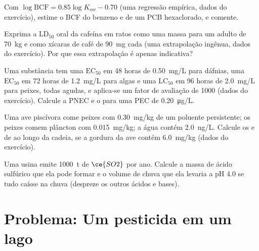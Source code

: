 \begin{exercise}[$\star\star$]\label{exo:b3:environmental-toxicology:8}
Com $\log\mathrm{BCF} = 0.85\log K_{ow} - 0.70$ (uma regressão empírica, dados do exercício), estime o BCF do
benzeno e de um PCB hexaclorado, e comente.
\end{exercise}

\begin{exercise}[$\star\star$]\label{exo:b3:environmental-toxicology:9}
Exprima a $\mathrm{LD_{50}}$ oral da cafeína em ratos como uma massa para um adulto de \qty{70}{kg} e como xícaras de café de
\qty{90}{mg} cada (uma extrapolação ingênua, dados do exercício). Por que essa extrapolação é apenas indicativa?
\end{exercise}

\begin{exercise}[$\star\star\star$]\label{exo:b3:environmental-toxicology:10}
Uma substância tem uma $\mathrm{EC_{50}}$ em 48 horas de \qty{0.50}{mg/L} para dáfnias, uma $\mathrm{EC_{50}}$ em 72 horas de \qty{1.2}{mg/L} para algas
e uma $\mathrm{LC_{50}}$ em 96 horas de \qty{2.0}{mg/L} para peixes, todas agudas, e aplica-se um fator de avaliação de 1000
(dados do exercício). Calcule a PNEC e o  para uma PEC de \qty{0.20}{\micro g/L}.
\end{exercise}

\begin{exercise}[$\star\star\star$]\label{exo:b3:environmental-toxicology:11}
Uma ave piscívora come peixes com \qty{0.30}{mg/kg} de um poluente persistente; os peixes comem
plâncton com \qty{0.015}{mg/kg}; a água contém \qty{2.0}{ng/L}. Calcule os  e de
 ao longo da cadeia, se a gordura da ave contém \qty{6.0}{mg/kg} (dados do
exercício).
\end{exercise}

\begin{exercise}[$\star\star\star$]\label{exo:b3:environmental-toxicology:12}
Uma usina emite \qty{1000}{t} de $\ce{SO2}$ por ano. Calcule a massa de ácido sulfúrico que ela pode formar
e o volume de chuva que ela levaria a pH 4.0 se tudo caísse na chuva (despreze os outros
ácidos e bases).
\end{exercise}

\section{Problema: Um pesticida em um lago}

